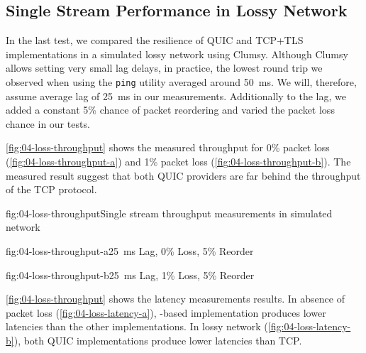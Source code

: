 \subsection{Single Stream Performance in Lossy Network}


In the last test, we compared the resilience of QUIC and TCP+TLS implementations in a simulated
lossy network using Clumsy. Although Clumsy allows setting very small lag delays, in practice, the
lowest round trip we observed when using the \texttt{ping} utility averaged around
\SI{50}{\milli\second}. We will, therefore, assume average lag of \SI{25}{\milli\second} in our
measurements. Additionally to the lag, we added a constant 5\% chance of packet reordering and
varied the packet loss chance in our tests.




\autoref{fig:04-loss-throughput} shows the measured throughput for 0\% packet loss
(\autoref{fig:04-loss-throughput-a}) and 1\% packet loss (\autoref{fig:04-loss-throughput-b}). The
measured result suggest that both QUIC providers are far behind the throughput of the TCP protocol.

\begin{myFigure}{fig:04-loss-throughput}{Single stream throughput measurements in simulated network}
\begin{mySubfigure}{0.49\linewidth}{fig:04-loss-throughput-a}{\SI{25}{\milli\second} Lag, 0\% Loss, 5\% Reorder}
\footnotesize

\end{mySubfigure}
\begin{mySubfigure}{0.49\linewidth}{fig:04-loss-throughput-b}{\SI{25}{\milli\second} Lag, 1\% Loss, 5\% Reorder}
\footnotesize

\end{mySubfigure}
\end{myFigure}

\autoref{fig:04-loss-throughput} shows the latency measurements results. In absence of packet loss
(\autoref{fig:04-loss-latency-a}), \libmsquic{}-based implementation produces lower latencies than
the other implementations. In lossy network (\autoref{fig:04-loss-latency-b}), both QUIC
implementations produce lower latencies than TCP\@.

